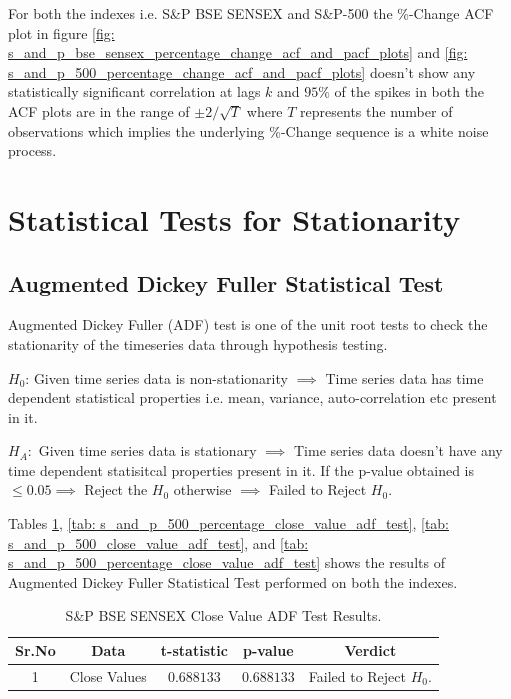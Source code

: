 \documentclass[conference]{IEEEtran}
\begin{document}
For both the indexes i.e. S\&P BSE SENSEX and S\&P-500 the \%-Change ACF plot in figure \ref{fig: s_and_p_bse_sensex_percentage_change_acf_and_pacf_plots} and \ref{fig: s_and_p_500_percentage_change_acf_and_pacf_plots} doesn't show any statistically significant correlation at lags $k$ and $95\%$ of the spikes in both the ACF plots are in the range of $\pm 2/\sqrt{T}$ where $T$ represents the number of observations which implies the underlying \%-Change sequence is a white noise process.

\twocolumn
\section{Statistical Tests for Stationarity}
\subsection{Augmented Dickey Fuller Statistical Test}
Augmented Dickey Fuller (ADF) test is one of the unit root tests to check the stationarity of the timeseries data through hypothesis testing.

$H_{0}$: Given time series data is non-stationarity $\implies$ Time series data has time dependent statistical properties i.e. mean, variance, auto-correlation etc present in it.

$H_{A}:$ Given time series data is stationary $\implies$ Time series data doesn't have any time dependent statisitcal properties present in it. \newline
If the p-value obtained is $\le 0.05 \implies$ Reject the $H_{0}$ otherwise $\implies$ Failed to Reject $H_{0}.$ \newline

Tables \ref{tab: s_and_p_bse_sensex_close_value_adf_test_results}, \ref{tab: s_and_p_500_percentage_close_value_adf_test}, \ref{tab: s_and_p_500_close_value_adf_test}, and \ref{tab: s_and_p_500_percentage_close_value_adf_test} shows the results of Augmented Dickey Fuller Statistical Test performed on both the indexes.

\begin{table}[htbp]
	\caption{S\&P BSE SENSEX Close Value ADF Test Results.}
	\begin{tabular}{|c|c|c|c|c|}
		\hline
		\textbf{Sr.No} & \textbf{Data} & \textbf{t-statistic} & \textbf{p-value} & \textbf{Verdict}        \\
		\hline
		1              & Close Values  & $0.688133$           & $0.688133$       & Failed to Reject $H_{0}$. \\
		\hline
	\end{tabular}
	\label{tab: s_and_p_bse_sensex_close_value_adf_test_results}
\end{table}
\end{document}
